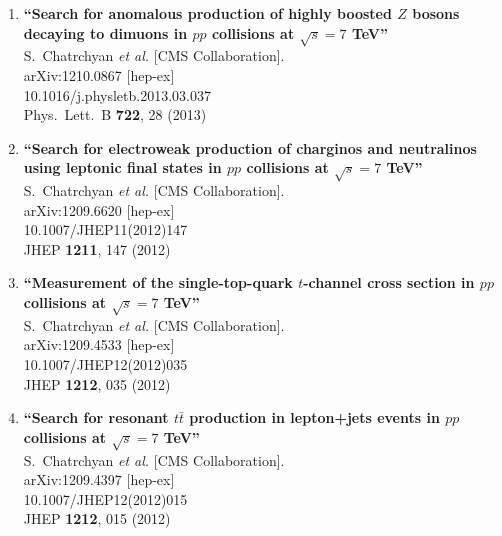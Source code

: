 \documentclass{article}
\begin{document}
\begin{enumerate}
\item%
{\bf ``Search for anomalous production of highly boosted $Z$ bosons decaying to dimuons in $pp$ collisions at $\sqrt{s}=7$ TeV''}
  \\{}S.~Chatrchyan {\it et al.}  [CMS Collaboration].
  \\{}arXiv:1210.0867 [hep-ex]
    \\{}10.1016/j.physletb.2013.03.037
\\{}Phys.\ Lett.\ B {\bf 722}, 28 (2013) %


\item%
{\bf ``Search for electroweak production of charginos and neutralinos using leptonic final states in $pp$ collisions at $\sqrt{s}=7$ TeV''}
  \\{}S.~Chatrchyan {\it et al.}  [CMS Collaboration].
  \\{}arXiv:1209.6620 [hep-ex]
    \\{}10.1007/JHEP11(2012)147
\\{}JHEP {\bf 1211}, 147 (2012) %


\item%
{\bf ``Measurement of the single-top-quark $t$-channel cross section in $pp$ collisions at $\sqrt{s}=7$ TeV''}
  \\{}S.~Chatrchyan {\it et al.}  [CMS Collaboration].
  \\{}arXiv:1209.4533 [hep-ex]
    \\{}10.1007/JHEP12(2012)035
\\{}JHEP {\bf 1212}, 035 (2012) %


\item%
{\bf ``Search for resonant $t\bar{t}$ production in lepton+jets events in $pp$ collisions at $\sqrt{s}=7$ TeV''}
  \\{}S.~Chatrchyan {\it et al.}  [CMS Collaboration].
  \\{}arXiv:1209.4397 [hep-ex]
    \\{}10.1007/JHEP12(2012)015
\\{}JHEP {\bf 1212}, 015 (2012) %



\end{enumerate}
\end{document}

